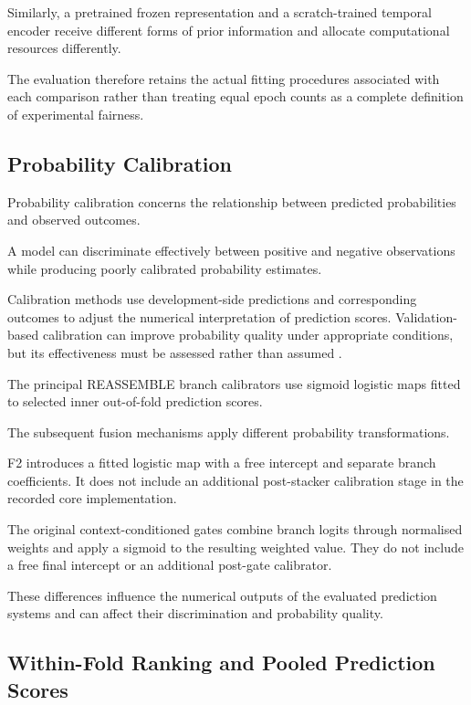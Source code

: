 Similarly, a pretrained frozen representation and a scratch-trained temporal encoder receive different forms of prior information and allocate computational resources differently.

The evaluation therefore retains the actual fitting procedures associated with each comparison rather than treating equal epoch counts as a complete definition of experimental fairness.

\subsection{Probability Calibration}

Probability calibration concerns the relationship between predicted probabilities and observed outcomes.

A model can discriminate effectively between positive and negative observations while producing poorly calibrated probability estimates.

Calibration methods use development-side predictions and corresponding outcomes to adjust the numerical interpretation of prediction scores. Validation-based calibration can improve probability quality under appropriate conditions, but its effectiveness must be assessed rather than assumed \parencite{Guo2017Calibration}.

The principal REASSEMBLE branch calibrators use sigmoid logistic maps fitted to selected inner out-of-fold prediction scores.

The subsequent fusion mechanisms apply different probability transformations.

F2 introduces a fitted logistic map with a free intercept and separate branch coefficients. It does not include an additional post-stacker calibration stage in the recorded core implementation.

The original context-conditioned gates combine branch logits through normalised weights and apply a sigmoid to the resulting weighted value. They do not include a free final intercept or an additional post-gate calibrator.

These differences influence the numerical outputs of the evaluated prediction systems and can affect their discrimination and probability quality.

\subsection{Within-Fold Ranking and Pooled Prediction Scores}

